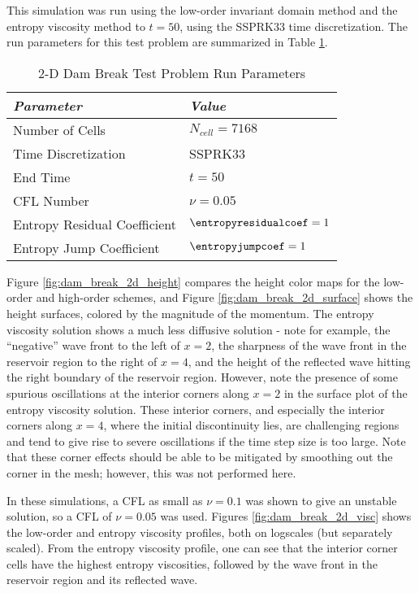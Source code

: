 This simulation was run using the low-order invariant domain method and
the entropy viscosity method to $t=50$, using the SSPRK33 time discretization.
The run parameters for this test problem are summarized in Table
\ref{tab:dam_break_2d_run}.

\begin{table}[htb]\caption{2-D Dam Break Test Problem Run Parameters}
\label{tab:dam_break_2d_run}
\centering
\begin{tabular}{l l}\toprule
\emph{Parameter} & \emph{Value}\\\midrule
Number of Cells & $N_{cell} = 7168$\\
Time Discretization & SSPRK33\\\midrule
End Time        & $t=50$\\
CFL Number      & $\nu=0.05$\\
Entropy Residual Coefficient & $\entropyresidualcoef=1$\\
Entropy Jump Coefficient & $\entropyjumpcoef=1$\\
\bottomrule\end{tabular}
\end{table}

Figure \ref{fig:dam_break_2d_height} compares the height color maps for
the low-order and high-order schemes, and Figure \ref{fig:dam_break_2d_surface} 
shows the height surfaces, colored by the magnitude of the momentum.
The entropy viscosity solution shows a much less diffusive solution - note
for example, the ``negative'' wave front to the left of $x=2$, the sharpness
of the wave front in the reservoir region to the right of $x=4$, and the height
of the reflected wave hitting the right boundary of the reservoir region.
However, note the presence of some spurious oscillations at the interior corners
along $x=2$ in the surface plot of the entropy viscosity solution. These
interior corners, and especially the interior corners along $x=4$, where
the initial discontinuity lies, are challenging regions and tend to give rise to
severe oscillations if the time step size is too large.
Note that these corner effects should be able to be mitigated by smoothing out
the corner in the mesh; however, this was not performed here.

In these simulations,
a CFL as small as $\nu=0.1$ was shown to give an unstable solution, so a
CFL of $\nu=0.05$ was used. Figures \ref{fig:dam_break_2d_visc} shows
the low-order and entropy viscosity profiles, both on logscales (but separately
scaled). From the entropy viscosity profile, one can see that the interior
corner cells have the highest entropy viscosities, followed by the wave
front in the reservoir region and its reflected wave.

